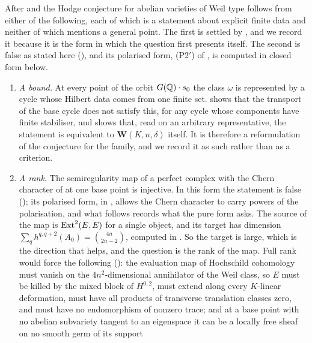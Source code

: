 \begin{remark}
\label{rem:tworemain}
After \cite[Theorem~16.9]{paperI} and  the Hodge
conjecture for abelian varieties of Weil type follows from either of the
following, each of which is a statement about explicit finite data and neither
of which mentions a general point. The first is settled by
\cite[Theorem~16.17]{paperI}, and we record it because it is the form in which the
question first presents itself. The second is false as stated here
(), and its polarised form, \textup{(P2$'$)} of
, is computed in closed form below.

\begin{enumerate}[label=\textup{(P\arabic*)},leftmargin=*]
\item \emph{A bound.} At every point of the orbit $G(\mathbb{Q})\cdot s_{0}$ the
  class $\omega$ is represented by a cycle whose Hilbert data comes from one
  finite set. \cite[Theorem~16.15]{paperI} shows that the transport of the base cycle
  does not satisfy this, for any cycle whose components have finite
  stabiliser, and \cite[Theorem~16.17]{paperI} shows that, read on an arbitrary
  representative, the statement is equivalent to $\mathbf{W}(K,n,\delta)$
  itself. It is therefore a reformulation of the conjecture for the family,
  and we record it as such rather than as a criterion.
\item \emph{A rank.} The semiregularity map of a perfect complex with the
  Chern character of  at one base point is injective.
  In this form the statement is false (); its polarised
  form, in , allows the Chern character to carry powers of
  the polarisation, and what follows records what the pure form asks. The
  source of the map is $\operatorname{Ext}^{2}(E,E)$ for a single object, and its target
  has dimension $\sum_{q}h^{q,q+2}(A_{0})=\binom{4n}{2n-2}$, computed in
  \cite[Proposition~9.2]{paperI}. So the target is large, which is the direction that
  helps, and the question is the rank of the map. Full rank would force the
  following (): the evaluation map of
  Hochschild cohomology must vanish on the $4n^{2}$-dimensional annihilator of
  the Weil class, so $E$ must be killed by the mixed block of $H^{0,2}$, must
  extend along every $K$-linear deformation, must have all products of
  transverse translation classes zero, and must have no endomorphism of
  nonzero trace; and at a base point with no abelian subvariety tangent to an
  eigenspace it can be a locally free sheaf on no smooth germ of its support

\end{enumerate}
\end{remark}
